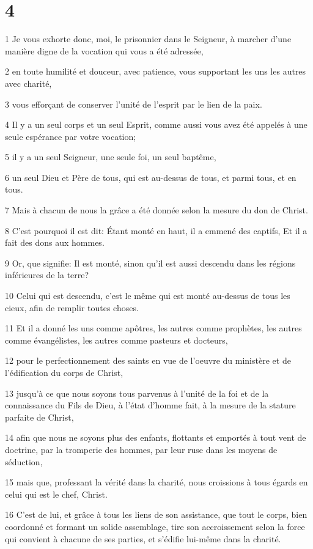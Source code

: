 \chapter{4}

\par 1 Je vous exhorte donc, moi, le prisonnier dans le Seigneur, à marcher d'une manière digne de la vocation qui vous a été adressée,
\par 2 en toute humilité et douceur, avec patience, vous supportant les uns les autres avec charité,
\par 3 vous efforçant de conserver l'unité de l'esprit par le lien de la paix.
\par 4 Il y a un seul corps et un seul Esprit, comme aussi vous avez été appelés à une seule espérance par votre vocation;
\par 5 il y a un seul Seigneur, une seule foi, un seul baptême,
\par 6 un seul Dieu et Père de tous, qui est au-dessus de tous, et parmi tous, et en tous.
\par 7 Mais à chacun de nous la grâce a été donnée selon la mesure du don de Christ.
\par 8 C'est pourquoi il est dit: Étant monté en haut, il a emmené des captifs, Et il a fait des dons aux hommes.
\par 9 Or, que signifie: Il est monté, sinon qu'il est aussi descendu dans les régions inférieures de la terre?
\par 10 Celui qui est descendu, c'est le même qui est monté au-dessus de tous les cieux, afin de remplir toutes choses.
\par 11 Et il a donné les uns comme apôtres, les autres comme prophètes, les autres comme évangélistes, les autres comme pasteurs et docteurs,
\par 12 pour le perfectionnement des saints en vue de l'oeuvre du ministère et de l'édification du corps de Christ,
\par 13 jusqu'à ce que nous soyons tous parvenus à l'unité de la foi et de la connaissance du Fils de Dieu, à l'état d'homme fait, à la mesure de la stature parfaite de Christ,
\par 14 afin que nous ne soyons plus des enfants, flottants et emportés à tout vent de doctrine, par la tromperie des hommes, par leur ruse dans les moyens de séduction,
\par 15 mais que, professant la vérité dans la charité, nous croissions à tous égards en celui qui est le chef, Christ.
\par 16 C'est de lui, et grâce à tous les liens de son assistance, que tout le corps, bien coordonné et formant un solide assemblage, tire son accroissement selon la force qui convient à chacune de ses parties, et s'édifie lui-même dans la charité.
